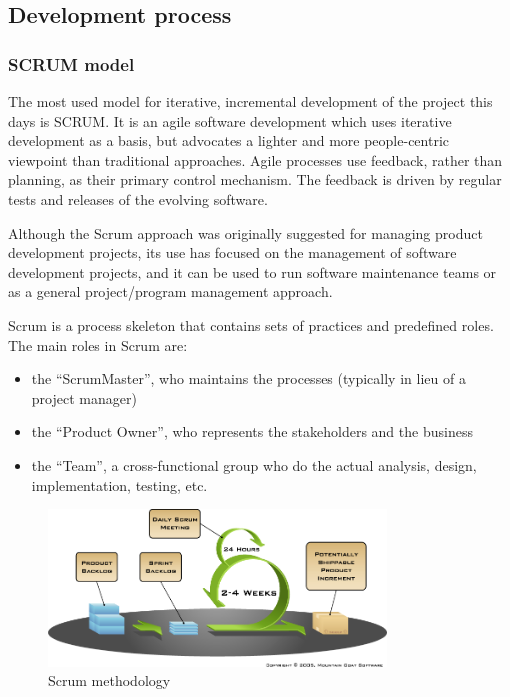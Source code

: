 \subsection{Development process}

	\subsubsection{SCRUM model}
	
	The most used model for iterative, incremental development of the project this days is SCRUM. It is an agile software development which uses iterative development as a basis, but advocates a lighter and more people-centric viewpoint than traditional approaches. Agile processes use feedback, rather than planning, as their primary control mechanism. The feedback is driven by regular tests and releases of the evolving software. \cite{wiki:development-process}\newline
	
	Although the Scrum approach was originally suggested for managing product development projects, its use has focused on the management of software development projects, and it can be used to run software maintenance teams or as a general project/program management approach.\newline
	
	Scrum is a process skeleton that contains sets of practices and predefined roles. The main roles in Scrum are:
	
	\begin{itemize}
		\item the “ScrumMaster”, who maintains the processes (typically in lieu of a project manager)
		\item the “Product Owner”, who represents the stakeholders and the business
		\item the “Team”, a cross-functional group who do the actual analysis, design, implementation, testing, etc.
	\end{itemize}
	
	\begin{figure}[htb]
		\centering
		\includegraphics[width=0.8\textwidth]{prestudy/development_process/scrum.png}
		\caption{Scrum methodology\cite{targetprocess:scrum}}
		\label{fig:scrum-methology}
	\end{figure}
	
